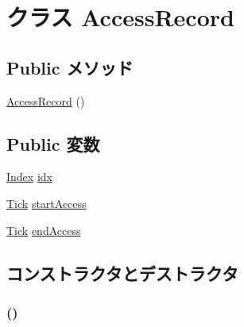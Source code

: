 \hypertarget{classBankedArray_1_1AccessRecord}{
\section{クラス AccessRecord}
\label{classBankedArray_1_1AccessRecord}
}
\subsection*{Public メソッド}
\begin{DoxyCompactItemize}
\item 
\hyperlink{classBankedArray_1_1AccessRecord_a1013e7a3eaa4336fe8ad1d0efd6497d1}{AccessRecord} ()
\end{DoxyCompactItemize}
\subsection*{Public 変数}
\begin{DoxyCompactItemize}
\item 
\hyperlink{TypeDefines_8hh_a39642de41f3574937f399f4fab25ba18}{Index} \hyperlink{classBankedArray_1_1AccessRecord_a6f53eba8af00fbd74cde35b7c969c63b}{idx}
\item 
\hyperlink{base_2types_8hh_a5c8ed81b7d238c9083e1037ba6d61643}{Tick} \hyperlink{classBankedArray_1_1AccessRecord_affa12ca1e67f52a12e4e229390e9fb95}{startAccess}
\item 
\hyperlink{base_2types_8hh_a5c8ed81b7d238c9083e1037ba6d61643}{Tick} \hyperlink{classBankedArray_1_1AccessRecord_aa168738fc5b3f26027b295fb7693b895}{endAccess}
\end{DoxyCompactItemize}


\subsection{コンストラクタとデストラクタ}
\hypertarget{classBankedArray_1_1AccessRecord_a1013e7a3eaa4336fe8ad1d0efd6497d1}{
\subsubsection[{AccessRecord}]{ ()}}
\label{classBankedArray_1_1AccessRecord_a1013e7a3eaa4336fe8ad1d0efd6497d1}



